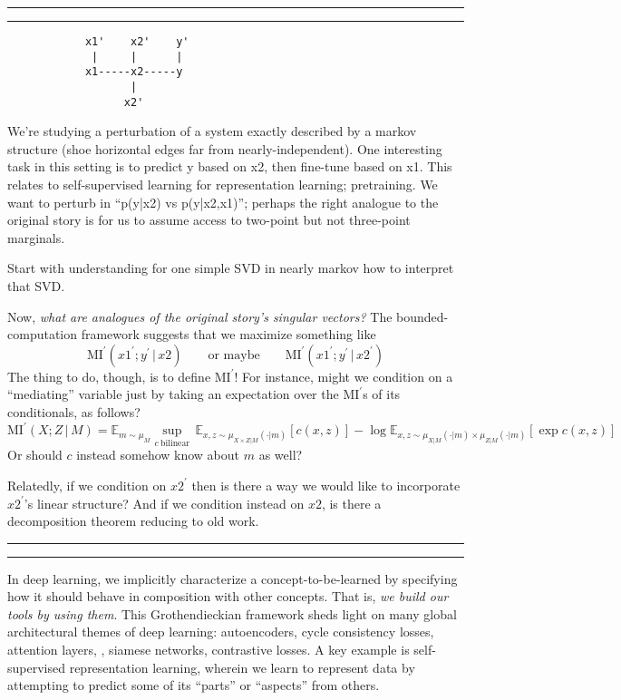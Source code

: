 \documentclass[11pt]{article}
\newcommand{\pr}{\prime}
\newcommand{\MI}{\text{MI}}
\newcommand{\Ee}{\mathbb{E}}\newcommand{\eE}{\mathcal{E}}
\theoremstyle{definition}
\begin{document}
\vspace{0.5cm}
\hrule
\vspace{0.1cm}
\hrule
\vspace{0.1cm}

    \begin{verbatim}
            x1'    x2'    y'
             |     |      |
            x1-----x2-----y
                   |
                  x2'
    \end{verbatim}
    We're studying a perturbation of a system exactly described by a markov
    structure (shoe horizontal edges far from nearly-independent).  One
    interesting task in this setting is to predict y based on x2, then
    fine-tune based on x1.  This relates to self-supervised learning for
    representation learning; pretraining.  
    We want to perturb in ``p(y|x2) vs p(y|x2,x1)''; perhaps the right analogue
    to the original story is for us to assume access to two-point but not
    three-point marginals.

    Start with understanding for one simple SVD in nearly markov how to
    interpret that SVD.

    Now, \emph{what are analogues of the original story's singular vectors?}
    The bounded-computation framework suggests that we maximize something like
    $$
        \MI^\pr(x1^\pr;y^\pr \,|\, x2)
        \quad
        \quad
        \text{or maybe}
        \quad
        \quad
        \MI^\pr(x1^\pr;y^\pr \,|\, x2^\pr)
    $$
    The thing to do, though, is to define $\MI^\pr$!
    For instance, might we condition on a ``mediating'' variable just by taking
    an expectation over the $\MI^\pr$s of its conditionals, as follows?
    $$
      \MI^\pr(X;Z\,|\,M) = \Ee_{m\sim \mu_{M}} \sup_{c~\text{bilinear}}\,
      \Ee_{x,z \sim \mu_{X\times Z|M}(\cdot|m)} \left[
        c(x,z)
      \right]
      -
      \log
      \Ee_{x,z \sim \mu_{X|M}(\cdot|m) \times \mu_{Z|M}(\cdot|m)} \left[
      \exp
        c(x,z)
      \right]
    $$
    Or should $c$ instead somehow know about $m$ as well?

    Relatedly, if we condition on $x2^\pr$ then is there a way we would
    like to incorporate $x2^\pr$'s linear structure?
    And if we condition instead on $x2$, is there a decomposition theorem reducing to old work.


\vspace{0.1cm}
\hrule
\vspace{0.1cm}
\hrule
\vspace{0.5cm}


  In deep learning, we implicitly characterize a concept-to-be-learned by
  specifying how it should behave in composition with other concepts.  That is,
  \emph{we build our tools by using them}.  This Grothendieckian framework
  sheds light on many global architectural themes of deep learning:
  autoencoders, cycle consistency losses, attention layers, , siamese networks,
  contrastive losses.  A key example is self-supervised representation
  learning, wherein we learn to represent data by attempting to predict some
  of its ``parts'' or ``aspects'' from others. 
\end{document}
